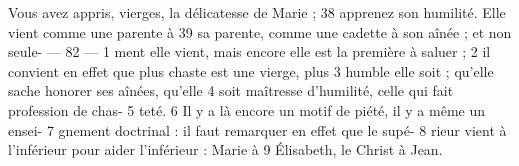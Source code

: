 Vous avez appris, vierges, la délicatesse de Marie ;	 
38	 	apprenez son humilité. Elle vient comme une parente à	 
39	 	sa parente, comme une cadette à son aînée ; et non seule-	 
 	--- 82 ---	 
1	 	ment elle vient, mais encore elle est la première à saluer ;	 
2	 	il convient en effet que plus chaste est une vierge, plus	 
3	 	humble elle soit ; qu'elle sache honorer ses aînées, qu'elle	 
4	 	soit maîtresse d'humilité, celle qui fait profession de chas-	 
5	 	teté.	 
6	 	Il y a là encore un motif de piété, il y a même un ensei-	 
7	 	gnement doctrinal : il faut remarquer en effet que le supé-	 
8	 	rieur vient à l'inférieur pour aider l'inférieur : Marie à	 
9	 	Élisabeth, le Christ à Jean.